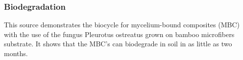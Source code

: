 \documentclass{article}
\begin{document}

\subsubsection{Biodegradation}
This source demonstrates the biocycle for mycelium-bound composites (MBC) with the use of
the fungus Pleurotus ostreatus grown on bamboo microfibers substrate. It shows that the
MBC’s can biodegrade in soil in as little as two months.\\


\newpage
\setlength{\bibitemsep}{1.2\baselineskip}
\printbibliography
\end{document}

